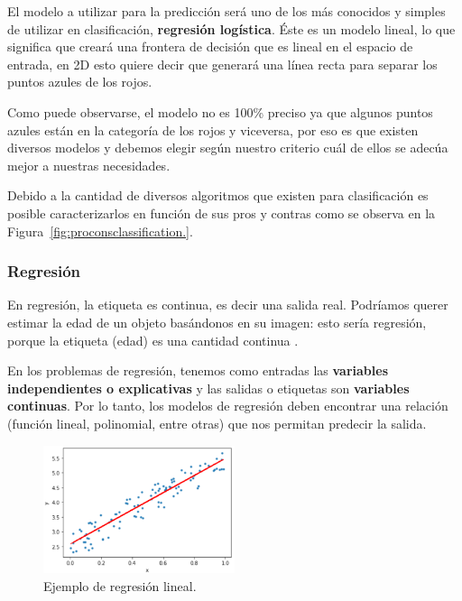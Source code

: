 \documentclass[a4paper,12pt]{article}
\begin{document}
El modelo a utilizar para la predicción será uno de los más conocidos y simples de utilizar en clasificación, \textbf{regresión logística}. Éste es un modelo lineal, lo que significa que creará una frontera de decisión que es lineal en el espacio de entrada, en 2D esto quiere decir que generará una línea recta para separar los puntos azules de los rojos.

Como puede observarse, el modelo no es 100\% preciso ya que algunos puntos azules están en la categoría de los rojos y viceversa, por eso es que existen diversos modelos y debemos elegir según nuestro criterio cuál de ellos se adecúa mejor a nuestras necesidades.

Debido a la cantidad de diversos algoritmos que existen para clasificación es posible caracterizarlos en función de sus pros y contras como se observa en la Figura~\ref{fig:proconsclassification.}.



\subsubsection{Regresión}

En regresión, la etiqueta es continua, es decir una salida real. Podríamos querer estimar la edad de un objeto basándonos en su imagen: esto sería regresión, porque la etiqueta (edad) es una cantidad continua \citep{GitHubpa25:online}.

En los problemas de regresión, tenemos como entradas las \textbf{variables independientes o explicativas} y las salidas o etiquetas son \textbf{variables continuas}. Por lo tanto, los modelos de regresión deben encontrar una relación (función lineal, polinomial, entre otras) que nos permitan predecir la salida.

\begin{figure}[H]
	\begin{center}				
		\includegraphics[width=0.5\textwidth]{tesis_9.png}
		\caption{Ejemplo de regresión lineal.}
		\label{fig:regressionlinear.}
	\end{center}
\end{figure}
\end{document}
